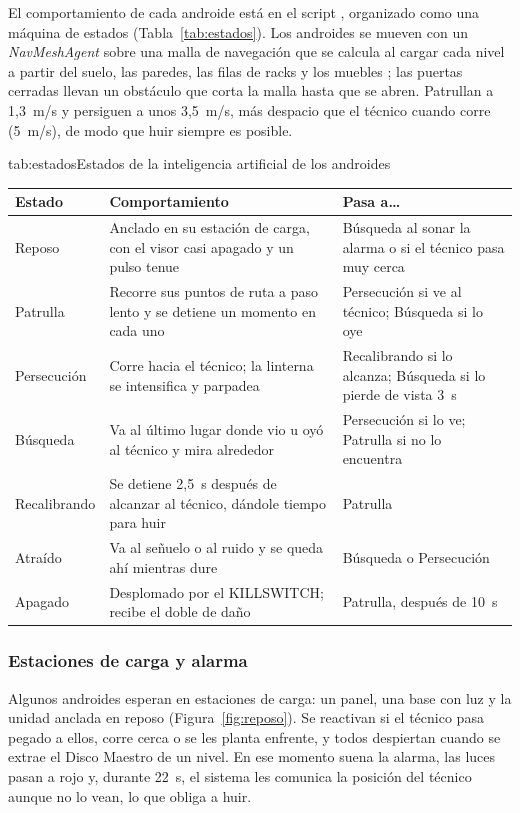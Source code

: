El comportamiento de cada androide está en el script , organizado como una máquina
de estados (Tabla~\ref{tab:estados}). Los androides se mueven con un \textit{NavMeshAgent} sobre
una malla de navegación que se calcula al cargar cada nivel a partir del suelo, las paredes, las
filas de racks y los muebles \parencite{unitymanual2026}; las puertas cerradas llevan un obstáculo
que corta la malla hasta que se abren. Patrullan a 1,3~m/s y persiguen a unos 3,5~m/s, más despacio
que el técnico cuando corre (5~m/s), de modo que huir siempre es posible.

\begin{TablaAPA}{tab:estados}{Estados de la inteligencia artificial de los androides}
\begin{tabularx}{\linewidth}{P{2.6cm}LP{4.4cm}}
\toprule
Estado & Comportamiento & Pasa a\ldots \\
\midrule
Reposo & Anclado en su estación de carga, con el visor casi apagado y un pulso tenue & Búsqueda al sonar la alarma o si el técnico pasa muy cerca \\
Patrulla & Recorre sus puntos de ruta a paso lento y se detiene un momento en cada uno & Persecución si ve al técnico; Búsqueda si lo oye \\
Persecución & Corre hacia el técnico; la linterna se intensifica y parpadea & Recalibrando si lo alcanza; Búsqueda si lo pierde de vista 3~s \\
Búsqueda & Va al último lugar donde vio u oyó al técnico y mira alrededor & Persecución si lo ve; Patrulla si no lo encuentra \\
Recalibrando & Se detiene 2,5~s después de alcanzar al técnico, dándole tiempo para huir & Patrulla \\
Atraído & Va al señuelo o al ruido y se queda ahí mientras dure & Búsqueda o Persecución \\
Apagado & Desplomado por el KILLSWITCH; recibe el doble de daño & Patrulla, después de 10~s \\
\bottomrule
\end{tabularx}
\end{TablaAPA}

\subsubsection{Estaciones de carga y alarma}

Algunos androides esperan en estaciones de carga: un panel, una base con luz y la unidad anclada en
reposo (Figura~\ref{fig:reposo}). Se reactivan si el técnico pasa pegado a ellos, corre cerca o se
les planta enfrente, y todos despiertan cuando se extrae el Disco Maestro de un nivel. En ese
momento suena la alarma, las luces pasan a rojo y, durante 22~s, el sistema les comunica la
posición del técnico aunque no lo vean, lo que obliga a huir.

